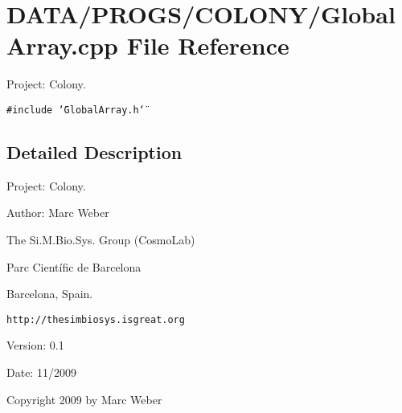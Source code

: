 \section{DATA/PROGS/COLONY/GlobalArray.cpp File Reference}
\label{GlobalArray_8cpp}
Project: Colony. 

{\tt \#include \char`\"{}GlobalArray.h\char`\"{}}\par


\subsection{Detailed Description}
Project: Colony. 

\begin{Desc}
\item[Author:]Marc Weber\par
 The Si.M.Bio.Sys. Group (CosmoLab)\par
 Parc Científic de Barcelona\par
 Barcelona, Spain.\par
 {\tt http://thesimbiosys.isgreat.org} \end{Desc}
\begin{Desc}
\item[Version:]0.1 \end{Desc}
\begin{Desc}
\item[Date:]11/2009\end{Desc}
Copyright 2009 by Marc Weber 